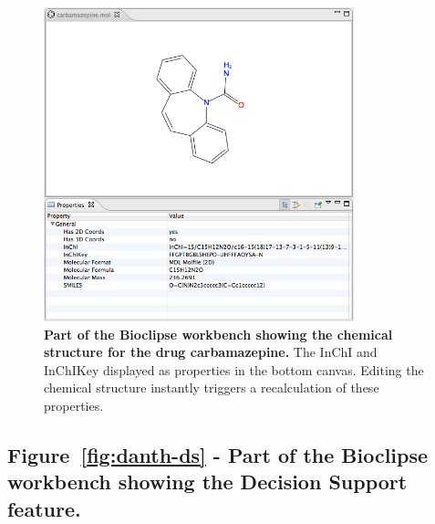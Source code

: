 \documentclass[10pt]{bmc_article}
\newenvironment{bmcformat}{\fussy\setboolean{publ}{true}}{\fussy}
\begin{document}
\begin{bmcformat}
\begin{figure}[!hb]
\begin{center}
	\includegraphics[width=9cm]{carbamazepine-props.png}
\caption{\textbf{Part of the Bioclipse workbench showing the chemical structure for the drug carbamazepine.} The InChI and InChIKey displayed as properties in the bottom canvas. Editing the chemical structure instantly triggers a recalculation of these properties.}\label{fig:carba-prop}
\end{center}
\end{figure}

\newpage

\subsection*{Figure~\ref{fig:danth-ds} - Part of the Bioclipse workbench showing the Decision Support feature.}



\end{bmcformat}
\end{document}

